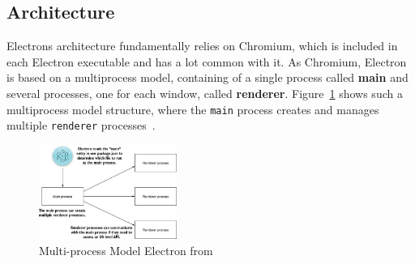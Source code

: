 \subsection{Architecture}
\label{subsec:electron:architecture}
Electrons architecture fundamentally relies on Chromium, which is included in each Electron executable and has a lot common with it.
As Chromium, Electron is based on a multiprocess model, containing of a single process called \textbf{main} and several processes, one for each window, called \textbf{renderer}.
Figure~\ref{fig:electron:model} shows such a multiprocess model structure, where the \texttt{main} process creates and manages multiple \texttt{renderer} processes~\cite{electron-in-action}.
\begin{figure}[ht]
    \centering
    \includegraphics[width=0.4\textwidth]{images/electron-model}
    \caption[Bla]{Multi-process Model Electron from~\cite[Fig. 1.7]{electron-in-action}}
    \label{fig:electron:model}
\end{figure}
